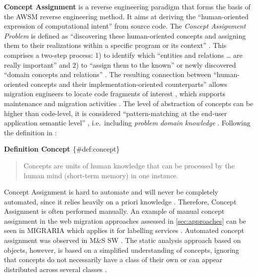 \textbf{Concept Assignment} is a reverse engineering paradigm that forms the basis of the AWSM reverse engineering method.
It aims at deriving the ``human-oriented expression of computational intent'' \autocite{Biggerstaff1994ConceptAssignmentJournal} from source code.
The \emph{Concept Assignment Problem} is defined as ``discovering these human-oriented concepts and assigning them to their realizations within a specific program or its context'' \autocite{Biggerstaff1994ConceptAssignmentJournal}.
This comprises a two-step process: 1) to identify which ``entities and relations \ldots{} are really important'' and 2) to ``assign them to the known'' or newly discovered ``domain concepts and relations'' \autocite{Biggerstaff1993ConceptAssignmentICSE}.
The resulting connection between ``human-oriented concepts and their implementation-oriented counterparts'' allows migration engineers to locate code fragments of interest \autocite{Tilley1996ProgramUnderstanding}, which supports maintenance and migration activities \autocite{Marcus2004ProblemLocation}.
The level of abstraction of concepts can be higher than code-level, it is considered ``pattern-matching at the end-user application semantic level'' \autocite{Tilley1996ProgramUnderstanding}, i.e.~including \emph{problem domain knowledge} \autocite{Marcus2004ProblemLocation}.
Following the definition in \autocite{Rajlich2002Concepts}:

\textbf{Definition Concept \autocite{Rajlich2002Concepts}} \{\#def:concept\}

\begin{quote}
Concepts are units of human knowledge that can be processed by the human mind (short-term memory) in one instance.
\end{quote}

Concept Assignment is hard to automate and will never be completely automated, since it relies heavily on a priori knowledge \autocite{Biggerstaff1993ConceptAssignmentICSE}.
Therefore, Concept Assignment is often performed manually.
An example of manual concept assignment in the web migration approaches assessed in \cref{sec:approaches} can be seen in MIGRARIA which applies it for labelling services \autocite{Sosa2014MigraSOA,Sosa2013MigraSOA}.
Automated concept assignment was observed in M\&S SW \autocite{Bodhuin2002DesktopWebMVC}.
The static analysis approach based on objects, however, is based on a simplified understanding of concepts, ignoring that concepts do not necessarily have a class of their own or can appear distributed across several classes \autocite{Rajlich2002Concepts}.

